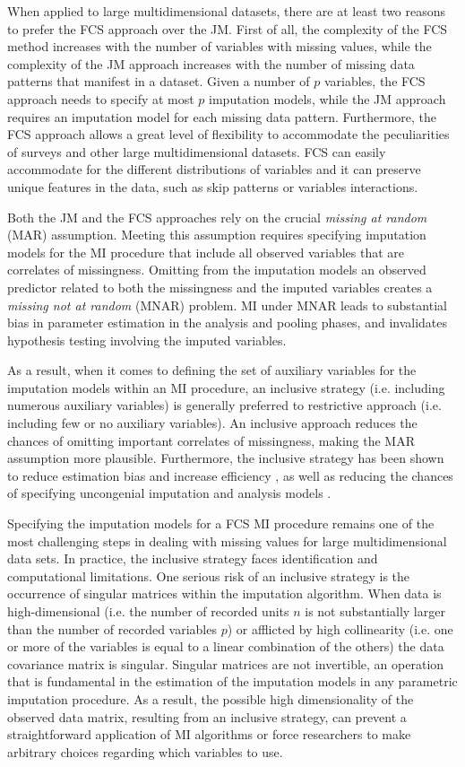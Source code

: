 When applied to large multidimensional datasets, there are at least two reasons to prefer the FCS approach over the JM.
First of all, the complexity of the FCS method increases with the number of variables with missing values, while the complexity
of the JM approach increases with the number of missing data patterns that manifest in a dataset.
Given a number of $p$ variables, the FCS approach needs to specify at most $p$ imputation models, while the JM 
approach requires an imputation model for each missing data pattern.
Furthermore, the FCS approach allows a great level of flexibility to accommodate the peculiarities of surveys and 
other large multidimensional datasets.
FCS can easily accommodate for the different distributions of variables and it can preserve unique features in the data,
such as skip patterns or variables interactions.

Both the JM and the FCS approaches rely on the crucial \emph{missing at random} (MAR) assumption.
Meeting this assumption requires specifying imputation models for the MI procedure that include all observed
variables that are correlates of missingness.
Omitting from the imputation models an observed predictor related to both the missingness and the imputed variables 
creates a \emph{missing not at random} (MNAR) problem.
MI under MNAR leads to substantial bias in parameter estimation in the analysis and pooling phases, and 
invalidates hypothesis testing involving the imputed variables.

As a result, when it comes to defining the set of auxiliary variables for the imputation models within an MI procedure, 
an inclusive strategy (i.e. including numerous auxiliary variables) is generally preferred to restrictive approach 
(i.e. including few or no auxiliary variables).
An inclusive approach reduces the chances of omitting important correlates of missingness, making the MAR assumption 
more plausible.
Furthermore, the inclusive strategy has been shown to reduce estimation bias and increase efficiency \citep{collinsEtAl:2001},
as well as reducing the chances of specifying uncongenial imputation and analysis models \citep{meng:1994}.

Specifying the imputation models for a FCS MI procedure remains one of the most challenging steps in dealing
with missing values for large multidimensional data sets.
In practice, the inclusive strategy faces identification and computational limitations.
One serious risk of an inclusive strategy is the occurrence of singular matrices within the imputation algorithm.
When data is high-dimensional (i.e. the number of recorded units $n$ is not substantially larger than the number of recorded 
variables $p$) or afflicted by high collinearity (i.e. one or more of the variables is equal to a linear 
combination of the others) the data covariance matrix is singular.
Singular matrices are not invertible, an operation that is fundamental in the estimation of the imputation 
models in any parametric imputation procedure.
As a result, the possible high dimensionality of the observed data matrix, resulting from an inclusive strategy, 
can prevent a straightforward application of MI algorithms or force researchers to make arbitrary choices 
regarding which variables to use.

